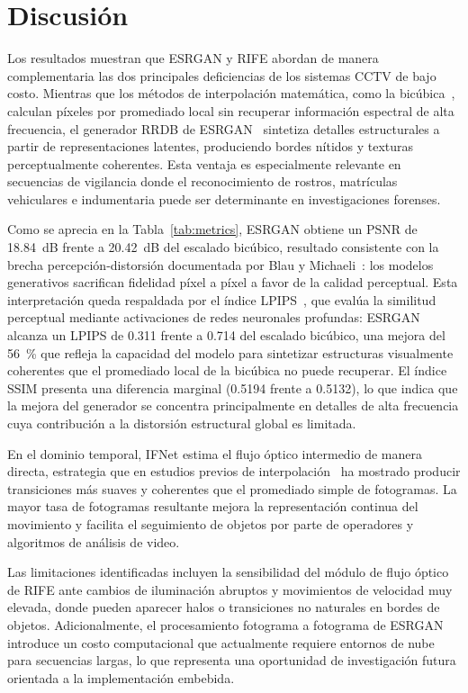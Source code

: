 \documentclass[conference]{IEEEtran}
\begin{document}
\section{Discusión}

Los resultados muestran que ESRGAN y RIFE abordan de manera complementaria las dos principales deficiencias de los sistemas CCTV de bajo costo. Mientras que los métodos de interpolación matemática, como la bicúbica~\cite{vanouwerkerk2006survey}, calculan píxeles por promediado local sin recuperar información espectral de alta frecuencia, el generador RRDB de ESRGAN~\cite{wang2018esrgan} sintetiza detalles estructurales a partir de representaciones latentes, produciendo bordes nítidos y texturas perceptualmente coherentes. Esta ventaja es especialmente relevante en secuencias de vigilancia donde el reconocimiento de rostros, matrículas vehiculares e indumentaria puede ser determinante en investigaciones forenses.

Como se aprecia en la Tabla~\ref{tab:metrics}, ESRGAN obtiene un PSNR de 18.84~dB frente a 20.42~dB del escalado bicúbico, resultado consistente con la brecha percepción-distorsión documentada por Blau y Michaeli~\cite{blau2018perception}: los modelos generativos sacrifican fidelidad píxel a píxel a favor de la calidad perceptual. Esta interpretación queda respaldada por el índice LPIPS~\cite{zhang2018lpips}, que evalúa la similitud perceptual mediante activaciones de redes neuronales profundas: ESRGAN alcanza un LPIPS de 0.311 frente a 0.714 del escalado bicúbico, una mejora del 56~\% que refleja la capacidad del modelo para sintetizar estructuras visualmente coherentes que el promediado local de la bicúbica no puede recuperar. El índice SSIM presenta una diferencia marginal (0.5194 frente a 0.5132), lo que indica que la mejora del generador se concentra principalmente en detalles de alta frecuencia cuya contribución a la distorsión estructural global es limitada.

En el dominio temporal, IFNet estima el flujo óptico intermedio de manera directa, estrategia que en estudios previos de interpolación~\cite{jiang2018superslomo, bao2019dain} ha mostrado producir transiciones más suaves y coherentes que el promediado simple de fotogramas. La mayor tasa de fotogramas resultante mejora la representación continua del movimiento y facilita el seguimiento de objetos por parte de operadores y algoritmos de análisis de video.

Las limitaciones identificadas incluyen la sensibilidad del módulo de flujo óptico de RIFE ante cambios de iluminación abruptos y movimientos de velocidad muy elevada, donde pueden aparecer halos o transiciones no naturales en bordes de objetos. Adicionalmente, el procesamiento fotograma a fotograma de ESRGAN introduce un costo computacional que actualmente requiere entornos de nube para secuencias largas, lo que representa una oportunidad de investigación futura orientada a la implementación embebida.
\end{document}
